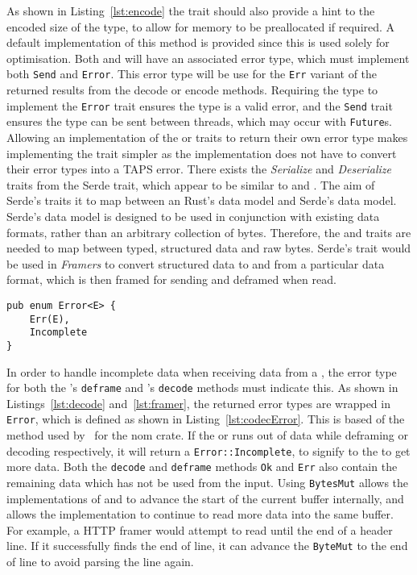 As shown in Listing~\ref{lst:encode} the \encode{} trait should also provide a hint to the encoded size of the type,
to allow for memory to be preallocated if required.
A default implementation of this method is provided since this is used solely for optimisation.
Both \encode{} and \decode{} will have an associated error type, which must implement both \texttt{Send} and
\texttt{Error}.
This error type will be use for the \texttt{Err} variant of the returned results from the decode or encode methods.
Requiring the type to implement the \texttt{Error} trait ensures the type is a valid error, and the \texttt{Send} trait
ensures the type can be sent between threads, which may occur with \texttt{Future}s.
Allowing an implementation of the \encode{} or \decode{} traits to return their own error type makes
implementing the trait simpler as the implementation does not have to convert their error types into a TAPS error.
There exists the \emph{Serialize} and \emph{Deserialize} traits from the Serde trait, which appear to be similar to
\encode{} and \decode{}.
The aim of Serde's traits it to map between an Rust's data model and Serde's data model.
Serde's data model is designed to be used in conjunction with existing data formats, rather than an arbitrary collection
of bytes.
Therefore, the \encode{} and \decode{} traits are needed to map between typed, structured data and raw bytes.
Serde's trait would be used in \emph{Framers} to convert structured data to and from a particular data format, which is
then framed for sending and deframed when read.

\begin{lstlisting}[float=h, label=lst:codecError, caption={The Error type for deframe and decode methods,
showing the Incomplete varient.
It is often aliased to DecodeError.}]
pub enum Error<E> {
    Err(E),
    Incomplete
}
\end{lstlisting}

In order to handle incomplete data when receiving data from a \connection{}, the error type for both the
\framer{}'s \texttt{deframe} and \decode{}'s \texttt{decode} methods must indicate this.
As shown in Listings~\ref{lst:decode} and~\ref{lst:framer}, the returned error types are wrapped in \texttt{Error},
which is defined as shown in Listing~\ref{lst:codecError}.
This is based of the method used by~\cite{geal_nomerrrust_} for the nom crate.
If the \framer{} or \decode{} runs out of data while deframing or decoding respectively, it will return a
\texttt{Error::Incomplete}, to signify to the \connection{} to get more data.
Both the \texttt{decode} and \texttt{deframe} methods \texttt{Ok} and \texttt{Err} also contain the remaining data which
has not be used from the input.
Using \texttt{BytesMut} allows the implementations of \decode{} and \framer{} to advance the start of the
current buffer internally, and allows the \connection{} implementation to continue to read more data into the same
buffer.
For example, a HTTP framer would attempt to read until the end of a header line.
If it successfully finds the end of line, it can advance the \texttt{ByteMut} to the end of line to avoid parsing the
line again.

